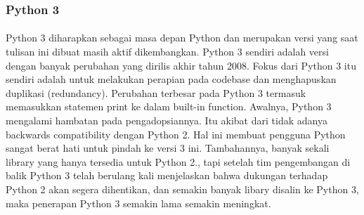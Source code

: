 \subsubsection{Python 3}
\paragraph{}
Python 3 diharapkan sebagai masa depan Python dan merupakan versi yang saat tulisan ini dibuat masih aktif dikembangkan. Python 3 sendiri adalah versi dengan banyak perubahan yang dirilis akhir tahun 2008. Fokus dari Python 3 itu sendiri adalah untuk melakukan perapian pada codebase dan menghapuskan duplikasi (redundancy). Perubahan terbesar pada Python 3 termasuk memasukkan statemen print ke dalam built-in function. Awalnya, Python 3 mengalami hambatan pada pengadopsiannya. Itu akibat dari tidak adanya backwards compatibility dengan Python 2. Hal ini membuat pengguna Python sangat berat hati untuk pindah ke versi 3 ini. Tambahannya, banyak sekali library yang hanya tersedia untuk Python 2., tapi setelah tim pengembangan di balik Python 3 telah berulang kali menjelaskan bahwa dukungan terhadap Python 2 akan segera dihentikan, dan semakin banyak libary disalin ke Python 3, maka penerapan Python 3 semakin lama semakin meningkat.
